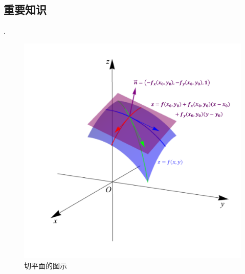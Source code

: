 \documentclass[12pt,UTF8]{ctexart}
\begin{document}
\subsection{重要知识}
\begin{enumerate}
.
\begin{figure}[H]
\begin{center}
\includegraphics[height=0.7\textheight]{Figures20190610/tangentsurface.pdf}
\end{center}
\caption{切平面的图示}
\end{figure}
\end{enumerate}
\end{document}
